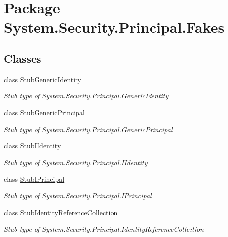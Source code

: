 \hypertarget{namespace_system_1_1_security_1_1_principal_1_1_fakes}{\section{Package System.\-Security.\-Principal.\-Fakes}
\label{namespace_system_1_1_security_1_1_principal_1_1_fakes}
}
\subsection*{Classes}
\begin{DoxyCompactItemize}
\item 
class \hyperlink{class_system_1_1_security_1_1_principal_1_1_fakes_1_1_stub_generic_identity}{Stub\-Generic\-Identity}
\begin{DoxyCompactList}\small\item\em Stub type of System.\-Security.\-Principal.\-Generic\-Identity\end{DoxyCompactList}\item 
class \hyperlink{class_system_1_1_security_1_1_principal_1_1_fakes_1_1_stub_generic_principal}{Stub\-Generic\-Principal}
\begin{DoxyCompactList}\small\item\em Stub type of System.\-Security.\-Principal.\-Generic\-Principal\end{DoxyCompactList}\item 
class \hyperlink{class_system_1_1_security_1_1_principal_1_1_fakes_1_1_stub_i_identity}{Stub\-I\-Identity}
\begin{DoxyCompactList}\small\item\em Stub type of System.\-Security.\-Principal.\-I\-Identity\end{DoxyCompactList}\item 
class \hyperlink{class_system_1_1_security_1_1_principal_1_1_fakes_1_1_stub_i_principal}{Stub\-I\-Principal}
\begin{DoxyCompactList}\small\item\em Stub type of System.\-Security.\-Principal.\-I\-Principal\end{DoxyCompactList}\item 
class \hyperlink{class_system_1_1_security_1_1_principal_1_1_fakes_1_1_stub_identity_reference_collection}{Stub\-Identity\-Reference\-Collection}
\begin{DoxyCompactList}\small\item\em Stub type of System.\-Security.\-Principal.\-Identity\-Reference\-Collection\end{DoxyCompactList}\item 

\end{DoxyCompactItemize}
